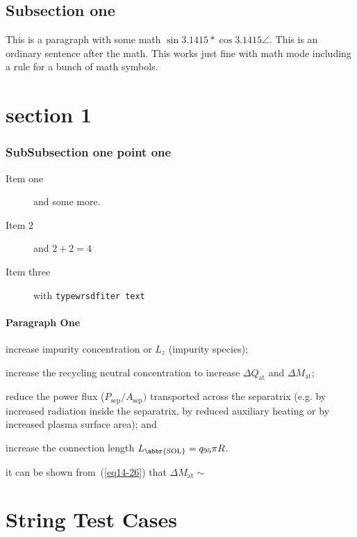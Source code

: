 \documentclass[letter]{article}
\begin{document}
\subsection{Subsection one}\label{sec:testLabel}
This is a paragraph with some math $ \sin{3.1415} * \cos{3.1415} \angle  $.  This is an ordinary sentence after the math.  This works just fine with math mode including a rule for a bunch of math symbols.

\section[Optional title]{section 1}

\subsubsection{SubSubsection one point one}
\begin{description}
    \item[Item one]  and some more.
    \item[Item $2$] and $2+2 = 4$
    \item[Item three] with \texttt{typewrsdfiter text}
\end{description}

\paragraph{Paragraph One}

\begin{inparaenum}
  \item increase impurity concentration or $L_{z}$ (impurity species);
  \item increase the recycling neutral concentration to increase $\Delta
    Q_{\text{at}}$ and $\Delta M_{\text{at}}$; 
  \item reduce the power flux
    ($P_{\text{sep}} / A_{\text{sep}})$ transported across the separatrix
    (e.g.  by increased radiation inside the separatrix, by reduced auxiliary
    heating or by increased plasma surface area); and \item increase the
    connection length $L_{\text{\abbr{SOL}}} = q_{95}\pi R$.
\end{inparaenum}
it can be shown from~(\ref{eq14-26}) that $\Delta M_{\text{at}} \sim$

\section{String Test Cases}
\end{document}
